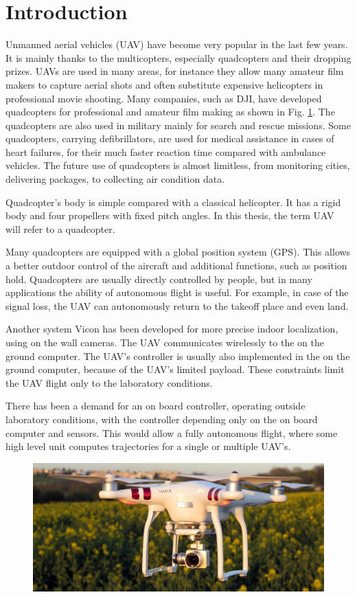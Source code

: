 \documentclass[a4paper,11pt,titlepage]{article}
\begin{document}
\section{Introduction}
Unmanned aerial vehicles (UAV) have become very popular in the last few years. It is mainly thanks to the multicopters, especially quadcopters and their dropping prizes. UAVs are used in many areas, for instance they allow many amateur film makers to capture aerial shots and often substitute expensive helicopters in professional movie shooting. Many companies, such as DJI, have developed quadcopters for professional and amateur film making as shown in Fig. \ref{fig:phantom}. The quadcopters are also used in military\cite{military} mainly for search and rescue missions. Some quadcopters\cite{tu_delft}, carrying defibrillators, are used for medical assistance in cases of heart failures, for their much faster reaction time compared with ambulance vehicles. The future use of quadcopters is almost limitless, from monitoring cities, delivering packages, to collecting air condition data. 

Quadcopter's body is simple compared with a classical helicopter. It has a rigid body and four propellers with fixed pitch angles. In this thesis, the term UAV will refer to a quadcopter.

Many quadcopters are equipped with a global position system (GPS). This allows a better outdoor control of the aircraft and additional functions, such as position hold. Quadcopters are usually directly controlled by people, but in many applications the ability of autonomous flight is useful. For example, in case of the signal loss, the UAV can autonomously return to the takeoff place and even land.

Another system Vicon has been developed for more precise indoor localization, using on the wall cameras. The UAV communicates wirelessly to the on the ground computer. The UAV's controller is usually also implemented in the on the ground computer, because of the UAV's limited payload. These constraints limit the UAV flight only to the laboratory conditions.

There has been a demand for an on board controller, operating outside laboratory conditions, with the controller depending only on the on board computer and sensors. This would allow a fully autonomous flight, where some high level unit computes trajectories for a single or multiple UAV's.

\begin{figure}[h]
\centering
\includegraphics[width=1\linewidth]{fig/phantom.jpg}
\label{fig:phantom}
\end{figure}
\end{document}
